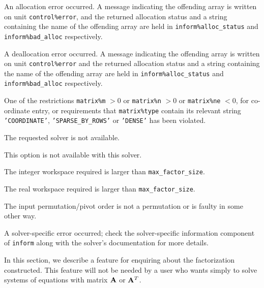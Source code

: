 \documentclass{galahad}
\begin{document}
\begin{description}

\itt{\galerrallocate} An allocation error occurred. A message indicating 
the offending 
array is written on unit {\tt control\%error}, and the returned allocation 
status and a string containing the name of the offending array
are held in {\tt inform\%alloc\_\-status}
and {\tt inform\%bad\_alloc} respectively.

\itt{\galerrdeallocate} A deallocation error occurred. 
A message indicating the offending 
array is written on unit {\tt control\%error} and the returned allocation 
status and a string containing the name of the offending array
are held in {\tt inform\%alloc\_\-status}
and {\tt inform\%bad\_alloc} respectively.

\itt{\galerrrestrictions} One of the restrictions 
 {\tt matrix\%m} $> 0$ or 
 {\tt matrix\%n} $> 0$ or 
 {\tt matrix\%ne} $< 0$, for co-ordinate entry,
  or requirements that {\tt matrix\%type} 
  contain its relevant string
{\tt 'COORDINATE'}, {\tt 'SPARSE\_BY\_ROWS'} or   {\tt 'DENSE'}
  has been violated.

\itt{\galunknownsolver} The requested solver is not available.

\itt{\galerrunavailable} This option is not available with this solver.

 The integer workspace required is larger than 
 {\tt max\_factor\_size}.

 The real workspace  required is larger than 
 {\tt max\_factor\_size}.


  The input permutation/pivot order is not a permutation or is
    faulty in some other way.

 A solver-specific error occurred; check the solver-specific 
  information component of {\tt inform} along with the solver's documentation
  for more details.

\end{description}


\galfeatures
\noindent In this section, we describe a feature for enquiring about
the factorization constructed. This feature
will not be needed by a user who wants simply to solve systems of 
equations with matrix ${\mathbf{A}}$ or ${\mathbf{A}}^T$. 
\end{document}
